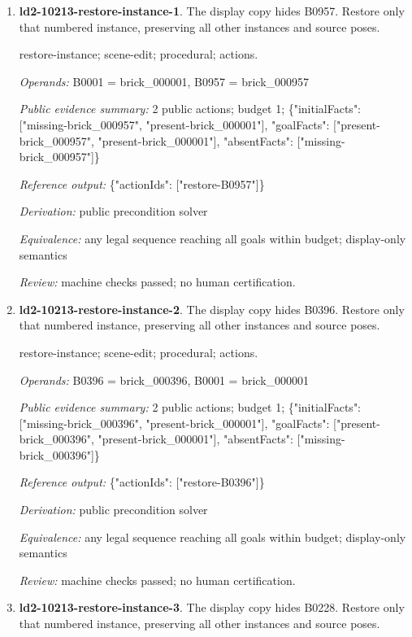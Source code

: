 \begin{enumerate}
\item \textbf{ld2-10213-restore-instance-1}. The display copy hides B0957. Restore only that numbered instance, preserving all other instances and source poses.
\par{\small restore-instance; scene-edit; procedural; actions.\par\textit{Operands:} B0001 = brick\_000001, B0957 = brick\_000957\par\textit{Public evidence summary:} 2 public actions; budget 1; \{"initialFacts": ["missing-brick\_000957", "present-brick\_000001"], "goalFacts": ["present-brick\_000957", "present-brick\_000001"], "absentFacts": ["missing-brick\_000957"]\}\par\textit{Reference output:} \{"actionIds": ["restore-B0957"]\}\par\textit{Derivation:} public precondition solver\par\textit{Equivalence:} any legal sequence reaching all goals within budget; display-only semantics\par\textit{Review:} machine checks passed; no human certification.}
\item \textbf{ld2-10213-restore-instance-2}. The display copy hides B0396. Restore only that numbered instance, preserving all other instances and source poses.
\par{\small restore-instance; scene-edit; procedural; actions.\par\textit{Operands:} B0396 = brick\_000396, B0001 = brick\_000001\par\textit{Public evidence summary:} 2 public actions; budget 1; \{"initialFacts": ["missing-brick\_000396", "present-brick\_000001"], "goalFacts": ["present-brick\_000396", "present-brick\_000001"], "absentFacts": ["missing-brick\_000396"]\}\par\textit{Reference output:} \{"actionIds": ["restore-B0396"]\}\par\textit{Derivation:} public precondition solver\par\textit{Equivalence:} any legal sequence reaching all goals within budget; display-only semantics\par\textit{Review:} machine checks passed; no human certification.}
\item \textbf{ld2-10213-restore-instance-3}. The display copy hides B0228. Restore only that numbered instance, preserving all other instances and source poses.

\end{enumerate}
